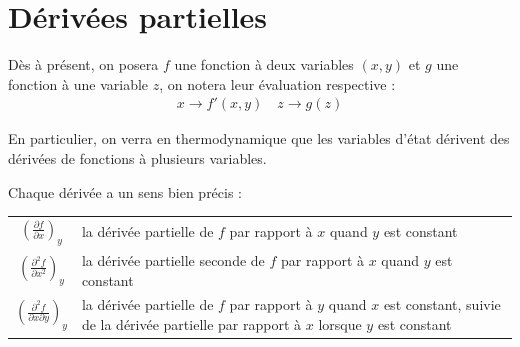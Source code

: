 \section{Dérivées partielles}

Dès à présent, on posera $f$ une fonction à deux variables $(x,y)$ et $g$ une fonction à une variable $z$, on notera leur évaluation respective : 
\begin{align*}
x \to f'(x,y) \quad z \to g(z)
\end{align*}

En particulier, on verra en thermodynamique que les variables d'état dérivent des dérivées de fonctions à plusieurs variables. 


Chaque dérivée a un sens bien précis : 

\begin{center}
\begin{tabular}{cC{12cm}}
$\left( \frac{\partial f}{\partial x} \right)_y$ & la dérivée partielle de $f$ par rapport à $x$ quand $y$ est constant \\
$\left( \frac{\partial^2 f}{\partial x^2} \right)_y$ & la dérivée partielle seconde de $f$ par rapport à $x$ quand $y$ est constant \\
$\left( \frac{\partial^2 f}{\partial x \partial y} \right)_y$ & la dérivée partielle de $f$ par rapport à $y$ quand $x$ est constant, suivie de la dérivée partielle par rapport à $x$ lorsque $y$ est constant
\end{tabular}
\end{center}

